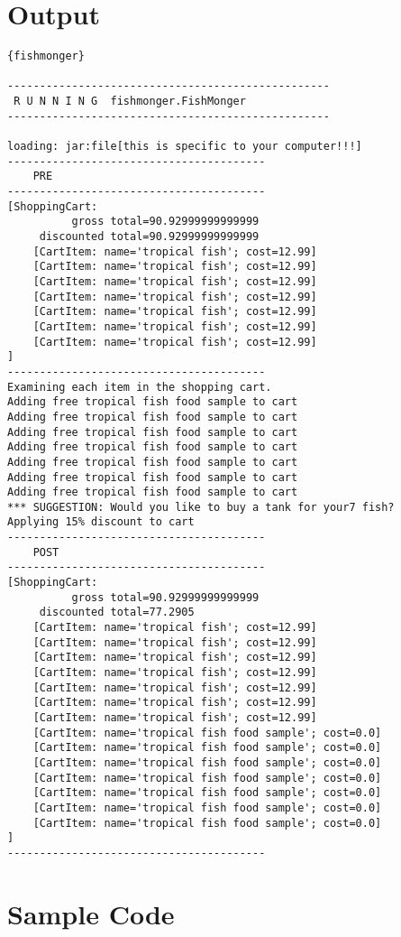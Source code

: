 \section {Output}
\begin{lstlisting}{fishmonger}

--------------------------------------------------
 R U N N I N G  fishmonger.FishMonger
--------------------------------------------------

loading: jar:file[this is specific to your computer!!!]
----------------------------------------
    PRE
----------------------------------------
[ShoppingCart:
	      gross total=90.92999999999999
	 discounted total=90.92999999999999
	[CartItem: name='tropical fish'; cost=12.99]
	[CartItem: name='tropical fish'; cost=12.99]
	[CartItem: name='tropical fish'; cost=12.99]
	[CartItem: name='tropical fish'; cost=12.99]
	[CartItem: name='tropical fish'; cost=12.99]
	[CartItem: name='tropical fish'; cost=12.99]
	[CartItem: name='tropical fish'; cost=12.99]
]
----------------------------------------
Examining each item in the shopping cart.
Adding free tropical fish food sample to cart
Adding free tropical fish food sample to cart
Adding free tropical fish food sample to cart
Adding free tropical fish food sample to cart
Adding free tropical fish food sample to cart
Adding free tropical fish food sample to cart
Adding free tropical fish food sample to cart
*** SUGGESTION: Would you like to buy a tank for your7 fish?
Applying 15% discount to cart
----------------------------------------
    POST
----------------------------------------
[ShoppingCart:
	      gross total=90.92999999999999
	 discounted total=77.2905
	[CartItem: name='tropical fish'; cost=12.99]
	[CartItem: name='tropical fish'; cost=12.99]
	[CartItem: name='tropical fish'; cost=12.99]
	[CartItem: name='tropical fish'; cost=12.99]
	[CartItem: name='tropical fish'; cost=12.99]
	[CartItem: name='tropical fish'; cost=12.99]
	[CartItem: name='tropical fish'; cost=12.99]
	[CartItem: name='tropical fish food sample'; cost=0.0]
	[CartItem: name='tropical fish food sample'; cost=0.0]
	[CartItem: name='tropical fish food sample'; cost=0.0]
	[CartItem: name='tropical fish food sample'; cost=0.0]
	[CartItem: name='tropical fish food sample'; cost=0.0]
	[CartItem: name='tropical fish food sample'; cost=0.0]
	[CartItem: name='tropical fish food sample'; cost=0.0]
]
----------------------------------------
\end{lstlisting}

\cleardoublepage
\section {Sample Code}
